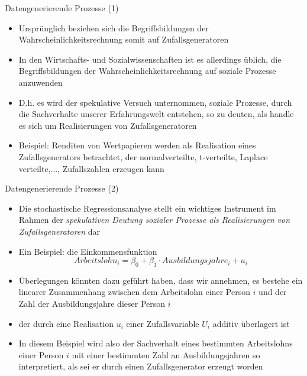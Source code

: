\documentclass[9pt]{beamer}
\begin{document}
\begin{frame}{Datengenerierende Prozesse (1)}
\begin{itemize}
\item Urspr\"{u}nglich beziehen sich die Begriffsbildungen der Wahrscheinlichkeitsrechnung somit auf Zufallsgeneratoren
\item In den Wirtschafts- und Sozialwissenschaften ist es allerdings \"{u}blich, die Begriffsbildungen der Wahrscheinlichkeitsrechnung auf soziale Prozesse anzuwenden
\item D.h. es wird der spekulative Versuch unternommen, soziale Prozesse, durch die Sachverhalte unserer Erfahrungswelt entstehen, so zu deuten, als handle es sich um Realisierungen von Zufallsgeneratoren
\item Beispiel: Renditen von Wertpapieren werden als Realisation eines Zufallsgenerators betrachtet, der normalverteilte, t-verteilte, Laplace verteilte,..., Zufallszahlen erzeugen kann
\end{itemize}
\end{frame}

\begin{frame}{Datengenerierende Prozesse (2)}
\begin{itemize}
  \item Die stochastische Regressionsanalyse stellt ein wichtiges Instrument im Rahmen der \emph{spekulativen Deutung sozialer Prozesse als Realisierungen von Zufallsgeneratoren} dar
\item Ein Beispiel: die Einkommensfunktion
$$ Arbeitslohn_i = \beta_0 + \beta_1 \cdot Ausbildungsjahre_i + u_i$$
\item \"{U}berlegungen k\"{o}nnten dazu gef\"{u}hrt haben, dass wir annehmen, es bestehe ein linearer Zusammenhang zwischen dem Arbeitslohn einer Person $i$ und der Zahl der Ausbildungsjahre dieser Person $i$
\item der durch eine Realisation $u_i$ einer Zufallsvariable $U_i$ additiv \"{u}berlagert ist
\item In diesem Beispiel wird also der Sachverhalt eines bestimmten Arbeitslohns einer Person $i$ mit einer bestimmten Zahl an Ausbildungsjahren so interpretiert, als sei er durch einen Zufallsgenerator erzeugt worden
\end{itemize}
\end{frame}
\end{document}
